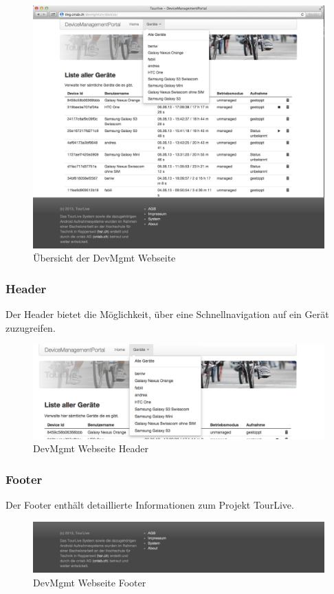 \begin{figure}[H]
	\centering
	\includegraphics[width=120mm]{images/devmgmtsrv/all.png}
	\caption{Übersicht der DevMgmt Webseite}
\end{figure}

\subsubsection{Header}
Der Header bietet die Möglichkeit, über eine Schnellnavigation auf ein Gerät zuzugreifen. 
\begin{figure}[H]
	\centering
	\includegraphics[width=120mm]{images/devmgmtsrv/header.png}
	\caption{DevMgmt Webseite Header}
\end{figure}



\subsubsection{Footer}
Der Footer enthält detaillierte Informationen zum Projekt TourLive. 
 
\begin{figure}[H]
	\centering
	\includegraphics[width=120mm]{images/devmgmtsrv/footer.png}
	\caption{DevMgmt Webseite Footer}
\end{figure}


